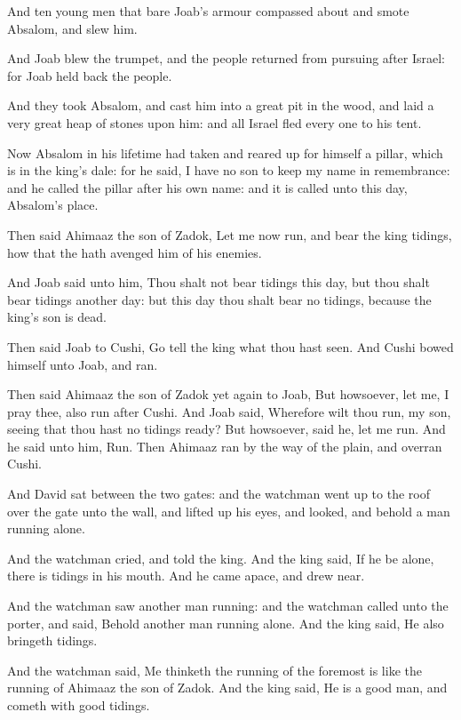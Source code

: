 \Verse And ten young men that bare Joab's armour compassed about and smote Absalom, and slew him.

\Verse And Joab blew the trumpet, and the people returned from pursuing after Israel: for Joab held back the people.

\Verse And they took Absalom, and cast him into a great pit in the wood, and laid a very great heap of stones upon him: and all Israel fled every one to his tent.

\Verse Now Absalom in his lifetime had taken and reared up for himself a pillar, which is in the king's dale: for he said, I have no son to keep my name in remembrance: and he called the pillar after his own name: and it is called unto this day, Absalom's place.

\Verse Then said Ahimaaz the son of Zadok, Let me now run, and bear the king tidings, how that the \LORD hath avenged him of his enemies.

\Verse And Joab said unto him, Thou shalt not bear tidings this day, but thou shalt bear tidings another day: but this day thou shalt bear no tidings, because the king's son is dead.

\Verse Then said Joab to Cushi, Go tell the king what thou hast seen.  And Cushi bowed himself unto Joab, and ran.

\Verse Then said Ahimaaz the son of Zadok yet again to Joab, But howsoever, let me, I pray thee, also run after Cushi. And Joab said, Wherefore wilt thou run, my son, seeing that thou hast no tidings ready?  \Verse But howsoever, said he, let me run. And he said unto him, Run. Then Ahimaaz ran by the way of the plain, and overran Cushi.

\Verse And David sat between the two gates: and the watchman went up to the roof over the gate unto the wall, and lifted up his eyes, and looked, and behold a man running alone.

\Verse And the watchman cried, and told the king. And the king said, If he be alone, there is tidings in his mouth. And he came apace, and drew near.

\Verse And the watchman saw another man running: and the watchman called unto the porter, and said, Behold another man running alone.  And the king said, He also bringeth tidings.

\Verse And the watchman said, Me thinketh the running of the foremost is like the running of Ahimaaz the son of Zadok. And the king said, He is a good man, and cometh with good tidings.


